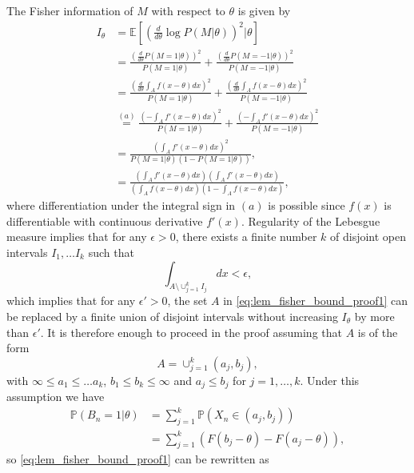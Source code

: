 \documentclass[letterpaper, 11pt]{IEEEtran}      %
\begin{document}
The Fisher information of $M$ with respect to $\theta$ is given by
\begin{align}
I_\theta & =  \mathbb E \left[ \left( \frac{d}{d\theta} \log P\left( M | \theta \right) \right)^2 |\theta \right] \nonumber \\
& = \frac{ \left(\frac{d}{d\theta} P(M=1|\theta) \right)^2}{P(M=1| \theta)} + \frac{ \left(\frac{d}{d\theta} P(M=-1|\theta) \right)^2} {P(M=-1| \theta)} \nonumber \\
& =  \frac{ \left( \frac{d}{d\theta} \int_A f \left( x-\theta\right)dx \right)^2} { P(M=1| \theta) } + \frac{ \left( \frac{d}{d\theta}\int_A f \left( x-\theta \right)dx \right)^2} { P(M=-1| \theta) } \nonumber \\ 
& \overset{(a)}{=} \frac{ \left( - \int_A f' \left( x-\theta \right)dx \right)^2} { P(M=1| \theta) } + \frac{ \left(- \int_A f' \left( x-\theta \right)dx \right)^2} { P(M=-1| \theta) } \nonumber \\ 
& = \frac{\left( \int_A f'\left( x-\theta \right) dx \right)^2 }{  P(M=1 | \theta) \left(1-P(M=1|\theta) \right)  }, \nonumber \\
& = \frac{\left( \int_A f'\left( x-\theta \right) dx \right) \left( \int_A f'\left( x-\theta \right) dx \right)}{ \left( \int_A f \left( x-\theta \right) dx \right)  \left(1- \int_A f \left( x-\theta \right) dx \right) }, \label{eq:lem_fisher_bound_proof1}
\end{align}
where differentiation under the integral sign in $(a)$ is possible since $f(x)$ is differentiable with continuous derivative $f'(x)$. Regularity of the Lebesgue measure implies that for any $\epsilon>0$, there exists a finite number $k$ of disjoint open intervals $I_1,\ldots I_k$ such that 
\[
\int_{A\setminus \cup_{j=1}^k I_j }  dx < \epsilon,
\]
which implies that for any $\epsilon' > 0$, the set $A$ in \eqref{eq:lem_fisher_bound_proof1} can be replaced by a finite union of disjoint intervals without increasing $I_\theta$ by more than $\epsilon'$. It is therefore enough to proceed in the proof assuming that $A$ is of the form
\[
A = \cup_{j=1}^k (a_j,b_j),
\]
with $\infty \leq a_1 \leq \ldots a_k$, $b_1 \leq b_k \leq \infty$ and $a_j \leq b_j$ for $j=1,\ldots,k$. Under this assumption we have
\begin{align*}
\mathbb P(B_n=1| \theta) & = \sum_{j=1}^k \mathbb P\left(X_n \in (a_j,b_j) \right)  \\
& = \sum_{j=1}^k \left( F \left(b_j-\theta\right) -  F \left(a_j-\theta\right)  \right),
\end{align*}
so \eqref{eq:lem_fisher_bound_proof1} can be rewritten as
\end{document}
